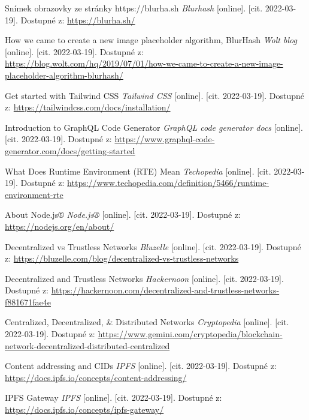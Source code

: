 \begin{thebibliography}{55}
    Snímek obrazovky ze stránky https://blurha.sh \textit{Blurhash} [online]. [cit. 2022-03-19]. Dostupné z: \url{https://blurha.sh/}
     
    How we came to create a new image placeholder algorithm, BlurHash \textit{Wolt blog} [online]. [cit. 2022-03-19]. Dostupné z: \url{https://blog.wolt.com/hq/2019/07/01/how-we-came-to-create-a-new-image-placeholder-algorithm-blurhash/}
    
    Get started with Tailwind CSS \textit{Tailwind CSS} [online]. [cit. 2022-03-19]. Dostupné z: \url{https://tailwindcss.com/docs/installation/}
        
    Introduction to GraphQL Code Generator \textit{GraphQL code generator docs} [online]. [cit. 2022-03-19]. Dostupné z: \url{https://www.graphql-code-generator.com/docs/getting-started}
            
    What Does Runtime Environment (RTE) Mean \textit{Techopedia} [online]. [cit. 2022-03-19]. Dostupné z: \url{https://www.techopedia.com/definition/5466/runtime-environment-rte}
    
    About Node.js® \textit{Node.js®} [online]. [cit. 2022-03-19]. Dostupné z: \url{https://nodejs.org/en/about/}
    
    Decentralized vs Trustless Networks \textit{Bluzelle} [online]. [cit. 2022-03-19]. Dostupné z: \url{https://bluzelle.com/blog/decentralized-vs-trustless-networks}

    Decentralized and Trustless Networks \textit{Hackernoon} [online]. [cit. 2022-03-19]. Dostupné z: \url{https://hackernoon.com/decentralized-and-trustless-networks-f881671fae4e}
    
    Centralized, Decentralized, \& Distributed Networks \textit{Cryptopedia} [online]. [cit. 2022-03-19]. Dostupné z: \url{https://www.gemini.com/cryptopedia/blockchain-network-decentralized-distributed-centralized}
    
    Content addressing and CIDs \textit{IPFS} [online]. [cit. 2022-03-19]. Dostupné z: \url{https://docs.ipfs.io/concepts/content-addressing/}
             
    IPFS Gateway \textit{IPFS} [online]. [cit. 2022-03-19]. Dostupné z: \url{https://docs.ipfs.io/concepts/ipfs-gateway/}
    

\end{thebibliography}
